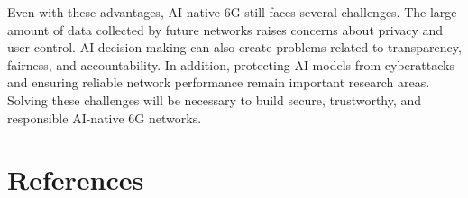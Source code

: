 \documentclass[letterpaper]{article}
\begin{document}
Even with these advantages, AI-native 6G still faces several challenges. The large amount of data collected by future networks raises concerns about privacy and user control. AI decision-making can also create problems related to transparency, fairness, and accountability. In addition, protecting AI models from cyberattacks and ensuring reliable network performance remain important research areas. Solving these challenges will be necessary to build secure, trustworthy, and responsible AI-native 6G networks.
\section{References}


\end{document}
